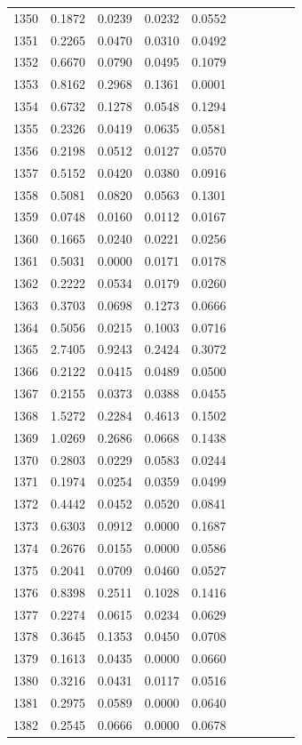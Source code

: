 \begin{table}
\begin{tabular}{cccccccccc}
1350& 0.1872& 0.0239& 0.0232& 0.0552\\ 
1351& 0.2265& 0.0470& 0.0310& 0.0492\\ 
1352& 0.6670& 0.0790& 0.0495& 0.1079\\ 
1353& 0.8162& 0.2968& 0.1361& 0.0001\\ 
1354& 0.6732& 0.1278& 0.0548& 0.1294\\ 
1355& 0.2326& 0.0419& 0.0635& 0.0581\\ 
1356& 0.2198& 0.0512& 0.0127& 0.0570\\ 
1357& 0.5152& 0.0420& 0.0380& 0.0916\\ 
1358& 0.5081& 0.0820& 0.0563& 0.1301\\ 
1359& 0.0748& 0.0160& 0.0112& 0.0167\\ 
1360& 0.1665& 0.0240& 0.0221& 0.0256\\ 
1361& 0.5031& 0.0000& 0.0171& 0.0178\\ 
1362& 0.2222& 0.0534& 0.0179& 0.0260\\ 
1363& 0.3703& 0.0698& 0.1273& 0.0666\\ 
1364& 0.5056& 0.0215& 0.1003& 0.0716\\ 
1365& 2.7405& 0.9243& 0.2424& 0.3072\\ 
1366& 0.2122& 0.0415& 0.0489& 0.0500\\ 
1367& 0.2155& 0.0373& 0.0388& 0.0455\\ 
1368& 1.5272& 0.2284& 0.4613& 0.1502\\ 
1369& 1.0269& 0.2686& 0.0668& 0.1438\\ 
1370& 0.2803& 0.0229& 0.0583& 0.0244\\ 
1371& 0.1974& 0.0254& 0.0359& 0.0499\\ 
1372& 0.4442& 0.0452& 0.0520& 0.0841\\ 
1373& 0.6303& 0.0912& 0.0000& 0.1687\\ 
1374& 0.2676& 0.0155& 0.0000& 0.0586\\ 
1375& 0.2041& 0.0709& 0.0460& 0.0527\\ 
1376& 0.8398& 0.2511& 0.1028& 0.1416\\ 
1377& 0.2274& 0.0615& 0.0234& 0.0629\\ 
1378& 0.3645& 0.1353& 0.0450& 0.0708\\ 
1379& 0.1613& 0.0435& 0.0000& 0.0660\\ 
1380& 0.3216& 0.0431& 0.0117& 0.0516\\ 
1381& 0.2975& 0.0589& 0.0000& 0.0640\\ 
1382& 0.2545& 0.0666& 0.0000& 0.0678\\ 

\end{tabular}
\end{table}
